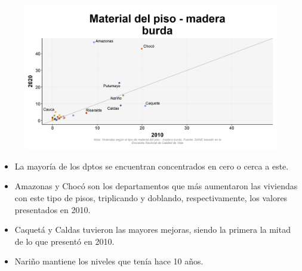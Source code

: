     \begin{figure}[H]
        \caption[Viviendas con piso de madera burda por departamentos - 2010 VS 2020 ]{\label{piso_madera_burda_dptos_vs} }
        \begin{center}
        \includegraphics[width=\textwidth,keepaspectratio]{img/var_175_scatter_time.png}
        \end{center}
    \end{figure}
            \begin{itemize}
                    \item La mayoría de los dptos se encuentran concentrados en cero o cerca a este.
                    \item Amazonas y Chocó son los departamentos que más aumentaron las viviendas con este tipo de pisos, triplicando y doblando, respectivamente, los valores presentados en 2010.
                    \item Caquetá y Caldas tuvieron las mayores mejoras, siendo la primera la mitad de lo que presentó en 2010.
                    \item Nariño mantiene los niveles que tenía hace 10 años.
                    \end{itemize}

